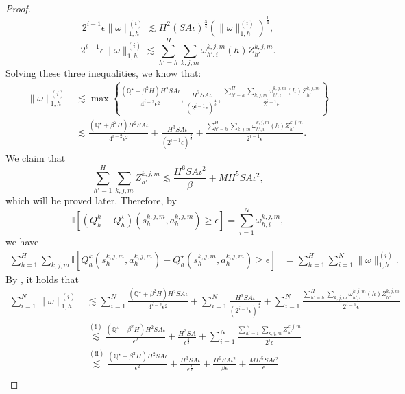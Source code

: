 \documentclass{article}
\begin{document}
\begin{proof}
$$2^{i-1}\epsilon\|\omega\|_{1,h}^{(i)} \lesssim H^2(SA\iota)^{\frac{3}{4}}(\|\omega\|_{1,h}^{(i)})^{\frac{1}{4}},$$
$$2^{i-1}\epsilon\|\omega\|_{1,h}^{(i)} \lesssim \sum_{h' = h}^{H}\sum_{k,j,m} \omega_{h',i}^{k,j,m}(h)Z_{h'}^{k,j,m}.$$
Solving these three inequalities, we know that:
\begin{align}
    \|\omega\|_{1,h}^{(i)} &\lesssim \max\left\{  \frac{\left(\mathbb{Q}^\star+\beta^2H\right)H^2SA\iota}{4^{i-2}\epsilon^2}, \frac{H^3SA\iota}{(2^{i-1}\epsilon)^{\frac{4}{3}}},\frac{\sum_{h' = h}^{H}\sum_{k,j,m} \omega_{h',i}^{k,j,m}(h)Z_{h'}^{k,j,m}}{2^{i-1}\epsilon}\right\}\nonumber \\
    &\lesssim \frac{\left(\mathbb{Q}^\star+\beta^2H\right)H^2SA\iota}{4^{i-2}\epsilon^2}+ \frac{H^3SA\iota}{(2^{i-1}\epsilon)^{\frac{4}{3}}}+\frac{\sum_{h' = h}^{H}\sum_{k,j,m} \omega_{h',i}^{k,j,m}(h)Z_{h'}^{k,j,m}}{2^{i-1}\epsilon}. \label{omegaelse}
 \end{align}
    We claim that
\begin{equation}
    \label{upperZ}
    \sum_{h' = 1}^{H}\sum_{k,j,m} Z_{h'}^{k,j,m} \lesssim \frac{H^6SA\iota^2}{\beta}+ MH^5SA\iota^2,
\end{equation}
which will be proved later. 
Therefore, by
    $$\mathbb{I} \left [\left(Q_h^k- Q_h^{\star}\right)(s_h^{k,j,m}, a_h^{k,j,m}) \geq \epsilon \right]  = \sum_{i=1}^N\omega_{h,i}^{k,j,m},$$
    we have
    \begin{align}
    \label{gapclipkmj1}
        \sum_{h=1}^H\sum_{k,j,m} \mathbb{I} \left [Q_h^k(s_h^{k,j,m}, a_h^{k,j,m}) - Q_h^{\star}(s_h^{k,j,m}, a_h^{k,j,m}) \geq \epsilon \right] 
        &= \sum_{h=1}^H\sum_{i=1}^N\|\omega\|_{1,h}^{(i)}. 
    \end{align}
    By , it holds that
    \begin{align}
    \label{gapclipkmj2}
        \sum_{i=1}^N\|\omega\|_{1,h}^{(i)} & \lesssim \sum_{i=1}^N\frac{\left(\mathbb{Q}^\star+\beta^2H\right)H^2SA\iota}{4^{i-2}\epsilon^2} +\sum_{i=1}^N\frac{H^3SA\iota}{(2^{i-1}\epsilon)^{\frac{4}{3}}}+ \sum_{i=1}^N\frac{\sum_{h' = h}^{H}\sum_{k,j,m} \omega_{h',i}^{k,j,m}(h)Z_{h'}^{k,j,m}}{2^{i-1}\epsilon} \nonumber\\
        &\overset{\mathrm{(i)}}{\lesssim} \frac{\left(\mathbb{Q}^\star+\beta^2H\right)H^2SA\iota}{\epsilon^2}+\frac{H^3SA}{\epsilon^{\frac{4}{3}}}  + \sum_{i=1}^N\frac{\sum_{h' = 1}^{H}\sum_{k,j,m} Z_{h'}^{k,j,m}}{2^i\epsilon} \nonumber\\
        &\overset{\mathrm{(ii)}}{\lesssim}  \frac{\left(\mathbb{Q}^\star+\beta^2H\right)H^2SA \iota}{\epsilon^2}+\frac{H^3SA\iota}{\epsilon^{\frac{4}{3}}}  + \frac{H^6SA\iota^2}{\beta\epsilon}+ \frac{MH^5SA\iota^2}{\epsilon} \nonumber\\

\end{align}
\end{proof}
\end{document}
